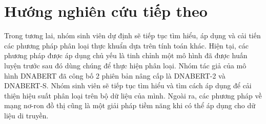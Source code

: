 \section{Hướng nghiên cứu tiếp theo}
Trong tương lai, nhóm sinh viên dự định sẽ tiếp tục tìm hiểu, áp dụng và cải tiến các phương pháp phân loại thực khuẩn dựa trên tính toán khác. Hiện tại, các phương pháp được áp dụng chủ yếu là tinh chỉnh một mô hình đã được huấn luyện trước sau đó dùng chúng để thực hiện phân loại. Nhóm tác giả của mô hình DNABERT\cite{ji2021dnabert} đã công bố 2 phiên bản nâng cấp là DNABERT-2\cite{zhou2023dnabert} và DNABERT-S\cite{zhou2024dnabert}. Nhóm sinh viên sẽ tiếp tục tìm hiểu và tìm cách áp dụng để cải thiện hiệu suất phân loại trên bộ dữ liệu của mình. Ngoài ra, các phương pháp về mạng nơ-ron đồ thị cũng là một giải pháp tiềm năng khi có thể áp dụng cho dữ liệu di truyền.